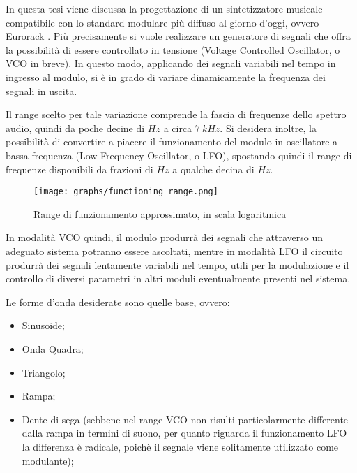 

In questa tesi viene discussa la progettazione di un sintetizzatore musicale compatibile con
lo standard modulare più diffuso al giorno d'oggi, ovvero Eurorack \cite{eurorack}. Più
precisamente si vuole realizzare un generatore di segnali che offra la possibilità di essere
controllato in tensione (Voltage Controlled Oscillator, o VCO in breve). In questo modo,
applicando dei segnali variabili nel tempo in ingresso al modulo, si è in grado di variare
dinamicamente la frequenza dei segnali in uscita.

Il range scelto per tale variazione comprende la fascia di frequenze dello spettro audio,
quindi da poche decine di $Hz$ a circa $7\ kHz$. Si desidera inoltre, la possibilità di
convertire a piacere il funzionamento del modulo in oscillatore a bassa frequenza (Low Frequency
Oscillator, o LFO), spostando quindi il range di frequenze disponibili da frazioni di
$Hz$ a qualche decina di $Hz$.
\medskip

\begin{figure}[H]
    \centering
    \texttt{[image: graphs/functioning\_range.png]}
    \caption{Range di funzionamento approssimato, in scala logaritmica}
    \label{functioning_range}
\end{figure}

In modalità VCO quindi, il modulo produrrà dei segnali che attraverso un adeguato sistema
potranno essere ascoltati, mentre in modalità LFO il circuito produrrà dei segnali lentamente
variabili nel tempo, utili per la modulazione e il controllo di diversi parametri in altri
moduli eventualmente presenti nel sistema.

Le forme d'onda desiderate sono quelle base, ovvero:

\begin{itemize}
    \item Sinusoide;
    \item Onda Quadra;
    \item Triangolo;
    \item Rampa;
    \item Dente di sega (sebbene nel range VCO non risulti particolarmente differente dalla
          rampa in termini di suono, per quanto riguarda il funzionamento LFO la differenza
          è radicale, poichè il segnale viene solitamente utilizzato come modulante);
\end{itemize}

